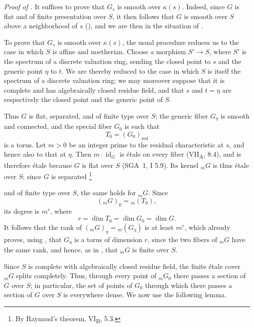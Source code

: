\medskip
\noindent\emph{Proof of .}
It suffices to prove that \(G_s\) is smooth over \(\kappa(s)\). Indeed,
since \(G\) is flat and of finite presentation over \(S\), it then follows
that \(G\) is smooth over \(S\) above a neighborhood of \(s\)
(), and we are then in the situation of .

To prove that \(G_s\) is smooth over \(\kappa(s)\), the usual procedure
reduces us to the case in which \(S\) is affine and noetherian. Choose a
morphism \(S'\to S\), where \(S'\) is the spectrum of a discrete
valuation ring, sending the closed point to \(s\) and the generic point
\(\eta\) to \(t\). We are thereby reduced to the case in which \(S\) is
itself the spectrum of a discrete valuation ring; we may moreover suppose
that it is complete and has algebraically closed residue field, and that
\(s\) and \(t=\eta\) are respectively the closed point and the generic
point of \(S\).

Thus \(G\) is flat, separated, and of finite type over \(S\); the generic
fiber \(G_\eta\) is smooth and connected, and the special fiber \(G_0\)
is such that
\[
  T_0=(G_0)_{\mathrm{red}}
\]
is a torus. Let \(m>0\) be an integer prime to the residual
characteristic at \(s\), and hence also to that at \(\eta\). Then
\(m\cdot\operatorname{id}_G\) is étale on every fiber
(VII\textsubscript{A}, 8.4), and is therefore étale because \(G\) is flat
over \(S\) (SGA~1, I 5.9). Its kernel \({}_mG\) is thus étale over \(S\);
since \(G\) is separated
\begingroup
\renewcommand{\thefootnote}{\(\ast\)}
\footnote{By Raynaud's theorem, VI\textsubscript{B}, 5.3.}
\endgroup
\addtocounter{footnote}{-1}%
and of finite type over \(S\), the same holds for \({}_mG\). Since
\[
  ({}_mG)_0={}_m(T_0),
\]
its degree is \(m^r\), where
\[
  r=\dim T_0=\dim G_0=\dim G.
\]
It follows that the rank of
\(({}_mG)_\eta={}_m(G_\eta)\) is at least \(m^r\), which already proves,
using , that \(G_\eta\) is a torus of dimension \(r\), since the two
fibers of \({}_mG\) have the same rank, and hence, as in , that
\({}_mG\) is finite over \(S\).

Since \(S\) is complete with algebraically closed residue field, the
finite étale cover \({}_mG\) splits completely. Thus, through every point
of \({}_mG_0\) there passes a section of \(G\) over \(S\); in particular,
the set of points of \(G_0\) through which there passes a section of \(G\)
over \(S\) is everywhere dense. We now use the following lemma.

